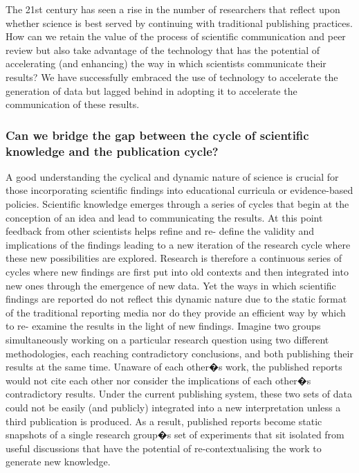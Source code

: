\documentclass[final,authoryear,3p]{elsarticle-open-drafting}
\begin{document}
The 21st century has seen a rise in the number of researchers that reflect upon whether science is best served by continuing with 
traditional publishing practices. How can we retain the value of the process of scientific communication and peer review but also 
take advantage of the technology that has the potential of accelerating (and enhancing) the way in which scientists communicate 
their results? We have successfully embraced the use of technology to accelerate the generation of data but lagged behind in 
adopting it to accelerate the communication of these results.

\subsubsection[Can we bridge the gap?]{Can we bridge the gap between the cycle of scientific knowledge and the publication cycle?}


A good understanding the cyclical and dynamic nature of science is crucial for those incorporating scientific findings into 
educational curricula or evidence-based policies. Scientific knowledge emerges through a series of cycles that begin at the 
conception of an idea and lead to communicating the results. At this point feedback from other scientists helps refine and re-
define the validity and implications of the findings leading to a new iteration of the research cycle where these new possibilities 
are explored. Research is therefore a continuous series of cycles where new findings are first put into old contexts and then integrated into new ones through the emergence of new data. Yet the ways in which scientific findings are reported do not reflect 
this dynamic nature due to the static format of the traditional reporting media nor do they provide an efficient way by which to re-
examine the results in the light of new findings. Imagine two groups simultaneously working on a particular research question 
using two different methodologies, each reaching contradictory conclusions, and both publishing their results at the same time. 
Unaware of each other�s work, the published reports would not cite each other nor consider the implications of each other�s 
contradictory results. Under the current publishing system, these two sets of data could not be easily (and publicly) integrated into 
a new interpretation unless a third publication is produced. As a result, published reports become static snapshots of a single 
research group�s set of experiments that sit isolated from useful discussions that have the potential of re-contextualising the work 
to generate new knowledge. 
\end{document}
